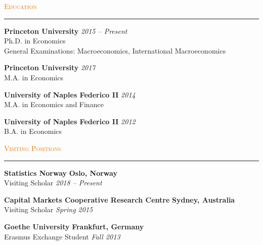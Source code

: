 \documentclass{resume} %
\renewenvironment{rSection}[1]{
\sectionskip
\textcolor[HTML]{e77500}{\textsc{#1}}
\sectionlineskip
\hrule
\begin{list}{}{
\setlength{\leftmargin}{1.5em}
}
\item[]
}{
\end{list}
}
\begin{document}

\begin{rSection}{Education}


{\bf Princeton University} \hfill {\em 2015 -- Present} 
\\ Ph.D. in Economics \hfill
\\ General Examinations: Macroeconomics, International Macroeconomics \hfill

{\bf Princeton University} \hfill {\em 2017} 
\\ M.A. in Economics \hfill

{\bf University of Naples Federico II} \hfill {\em 2014} 
\\ M.A. in Economics and Finance \hfill

{\bf University of Naples Federico II} \hfill {\em 2012} 
\\ B.A. in Economics \hfill


\end{rSection}


\begin{rSection}{Visiting Positions}

{\bf Statistics Norway} \hfill {\bf Oslo, Norway}
\\ Visiting Scholar \hfill {\em 2018 -- Present}

{\bf Capital Markets Cooperative Research Centre} \hfill {\bf Sydney, Australia}
\\ Visiting Scholar \hfill {\em Spring 2015}

{\bf Goethe University} \hfill {\bf Frankfurt, Germany}
\\ Erasmus Exchange Student \hfill {\em Fall 2013}

\end{rSection}

\end{document}
